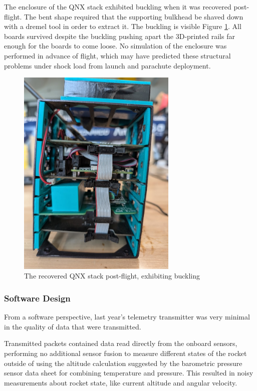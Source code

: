The enclosure of the QNX stack exhibited buckling when it was recovered post-flight. The bent shape required that the
supporting bulkhead be shaved down with a dremel tool in order to extract it. The buckling is visible Figure
\ref{fig:stack-bent}. All boards survived despite the buckling pushing apart the 3D-printed rails far enough for the
boards to come loose. No simulation of the enclosure was performed in advance of flight, which may have predicted these
structural problems under shock load from launch and parachute deployment.

\begin{figure}[H]
    \center
    \includegraphics[width=3in]{assets/images/bent-stack.jpg}
    \caption{The recovered QNX stack post-flight, exhibiting buckling}
    \label{fig:stack-bent}
\end{figure}

\subsubsection{Software Design}

From a software perspective, last year's telemetry transmitter was very minimal in the quality of data that were
transmitted.

Transmitted packets contained data read directly from the onboard sensors, performing no additional sensor fusion to
measure different states of the rocket outside of using the altitude calculation suggested by the barometric pressure
sensor data sheet for combining temperature and pressure. This resulted in noisy measurements about rocket state, like
current altitude and angular velocity.

